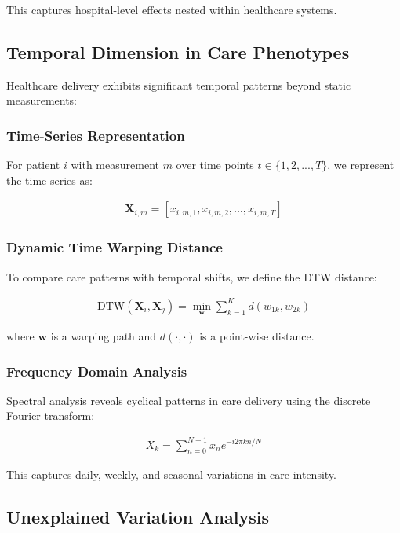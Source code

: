 \documentclass[12pt]{article}
\begin{document}
This captures hospital-level effects nested within healthcare systems.

\subsection{Temporal Dimension in Care Phenotypes}

Healthcare delivery exhibits significant temporal patterns beyond static measurements:

\subsubsection{Time-Series Representation}

For patient $i$ with measurement $m$ over time points $t \in \{1,2,...,T\}$, we represent the time series as:

\begin{align}
\mathbf{X}_{i,m} = [x_{i,m,1}, x_{i,m,2}, ..., x_{i,m,T}]
\end{align}

\subsubsection{Dynamic Time Warping Distance}

To compare care patterns with temporal shifts, we define the DTW distance:

\begin{align}
\text{DTW}(\mathbf{X}_i, \mathbf{X}_j) = \min_{\mathbf{w}} \sum_{k=1}^{K} d(w_{1k}, w_{2k})
\end{align}

where $\mathbf{w}$ is a warping path and $d(\cdot,\cdot)$ is a point-wise distance.

\subsubsection{Frequency Domain Analysis}

Spectral analysis reveals cyclical patterns in care delivery using the discrete Fourier transform:

\begin{align}
X_k = \sum_{n=0}^{N-1} x_n e^{-i2\pi kn/N}
\end{align}

This captures daily, weekly, and seasonal variations in care intensity.

\subsection{Unexplained Variation Analysis}
\end{document}
